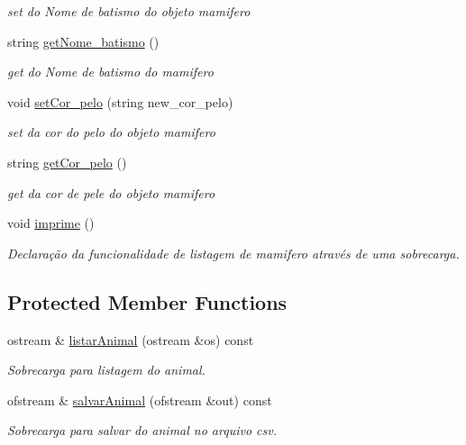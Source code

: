 \begin{DoxyCompactItemize}
\begin{DoxyCompactList}\small\item\em set do Nome de batismo do objeto mamifero \end{DoxyCompactList}\item 
string \mbox{\hyperlink{class_mamifero_a980ee6acb8aa3774e81349e4d0de3857}{get\+Nome\+\_\+batismo}} ()
\begin{DoxyCompactList}\small\item\em get do Nome de batismo do mamifero \end{DoxyCompactList}\item 
void \mbox{\hyperlink{class_mamifero_ab8f0efa8d0932f7549272478f0fc0b6f}{set\+Cor\+\_\+pelo}} (string new\+\_\+cor\+\_\+pelo)
\begin{DoxyCompactList}\small\item\em set da cor do pelo do objeto mamifero \end{DoxyCompactList}\item 
string \mbox{\hyperlink{class_mamifero_a8f078391ac1f3f6b4f2c5bb05a2bd268}{get\+Cor\+\_\+pelo}} ()
\begin{DoxyCompactList}\small\item\em get da cor de pele do objeto mamifero \end{DoxyCompactList}\item 
\mbox{\label{class_mamifero_ac32faf397fac43d8394bf0087cb154eb}} 
void \mbox{\hyperlink{class_mamifero_ac32faf397fac43d8394bf0087cb154eb}{imprime}} ()
\begin{DoxyCompactList}\small\item\em Declaração da funcionalidade de listagem de mamifero através de uma sobrecarga. \end{DoxyCompactList}\end{DoxyCompactItemize}
\subsection*{Protected Member Functions}
\begin{DoxyCompactItemize}
\item 
\mbox{\label{class_mamifero_a9d14b9bd1711071cedae71c2f38c3dbd}} 
ostream \& \mbox{\hyperlink{class_mamifero_a9d14b9bd1711071cedae71c2f38c3dbd}{listar\+Animal}} (ostream \&os) const
\begin{DoxyCompactList}\small\item\em Sobrecarga para listagem do animal. \end{DoxyCompactList}\item 
\mbox{\label{class_mamifero_a05e3bdc3c15b439957cc9dcc38e5a9cb}} 
ofstream \& \mbox{\hyperlink{class_mamifero_a05e3bdc3c15b439957cc9dcc38e5a9cb}{salvar\+Animal}} (ofstream \&out) const
\begin{DoxyCompactList}\small\item\em Sobrecarga para salvar do animal no arquivo csv. \end{DoxyCompactList}\end{DoxyCompactItemize}
